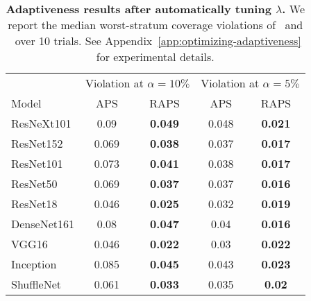 \begin{table}[t]
\centering
\small
\begin{tabular}{lcccc}
\toprule 
 & \multicolumn{2}{c}{Violation at $\alpha=10\%$}  & \multicolumn{2}{c}{Violation at $\alpha=5\%$} \\ 
\cmidrule(r){2-3}  \cmidrule(r){4-5} 
Model & APS & RAPS & APS & RAPS \\ 
\midrule 
ResNeXt101 & 0.09 & \bf 0.049 & 0.048 & \bf 0.021 \\ 
ResNet152 & 0.069 & \bf 0.038 & 0.037 & \bf 0.017 \\ 
ResNet101 & 0.073 & \bf 0.041 & 0.038 & \bf 0.017 \\ 
ResNet50 & 0.069 & \bf 0.037 & 0.037 & \bf 0.016 \\ 
ResNet18 & 0.046 & \bf 0.025 & 0.032 & \bf 0.019 \\ 
DenseNet161 & 0.08 & \bf 0.047 & 0.04 & \bf 0.016 \\ 
VGG16 & 0.046 & \bf 0.022 & 0.03 & \bf 0.022 \\ 
Inception & 0.085 & \bf 0.045 & 0.043 & \bf 0.023 \\ 
ShuffleNet & 0.061 & \bf 0.033 & 0.035 & \bf 0.02 \\ 
\bottomrule 
\end{tabular} 
\caption{\textbf{Adaptiveness results after automatically tuning $\lambda$.} We report the median worst-stratum coverage violations of \aps\ and \raps\ over 10 trials. See Appendix~\ref{app:optimizing-adaptiveness} for experimental details.} 
\label{table:tunelambda} 
\end{table} 
